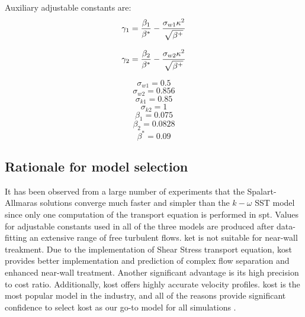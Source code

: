 \documentclass[english]{kththesis}
\begin{document}
Auxiliary adjustable constants are:
\begin{equation}{\gamma _1} = {{{\beta _1}} \over {{\beta ^*}}} - {{{\sigma _{w1}}{\kappa ^2}} \over {\sqrt {{\beta ^ + }} }}\end{equation}

\begin{equation}{\gamma _2} = {{{\beta _2}} \over {{\beta ^*}}} - {{{\sigma _{w2}}{\kappa ^2}} \over {\sqrt {{\beta ^ + }} }}\end{equation}

\begin{equation}{\sigma _{w1}} = 0.5 \end{equation}
\begin{equation}{\sigma _{w2}} = 0.856  \end{equation}
\begin{equation}{\sigma _{k1}} = 0.85 \end{equation}
\begin{equation}{\sigma _{k2}} = 1 \end{equation}
\begin{equation}{\beta _1} = 0.075 \end{equation}
\begin{equation}{\beta _2} = 0.0828 \end{equation}
\begin{equation}{\beta ^*} = 0.09 \end{equation}

\subsection{Rationale for model selection}
It has been observed from a large number of experiments that the Spalart-Allmaras solutions converge much faster and simpler than the $k-\omega$ SST model since only one computation of the transport equation is performed in \acrshort{spt}. Values for adjustable constants used in all of the three models are produced after data-fitting an extensive range of free turbulent flows. \acrshort{ket} is not suitable for near-wall treakment. Due to the implementation of Shear Stress transport equation, \acrshort{kost} provides better implementation and prediction of complex flow separation and enhanced near-wall treatment. Another significant advantage is its high precision to cost ratio. Additionally, \acrshort{kost} offers highly accurate velocity profiles. \acrshort{kost} is the most popular model in the industry, and all of the reasons provide significant confidence to select \acrshort{kost} as our go-to model for all simulations . 
\cleardoublepage
\end{document}
